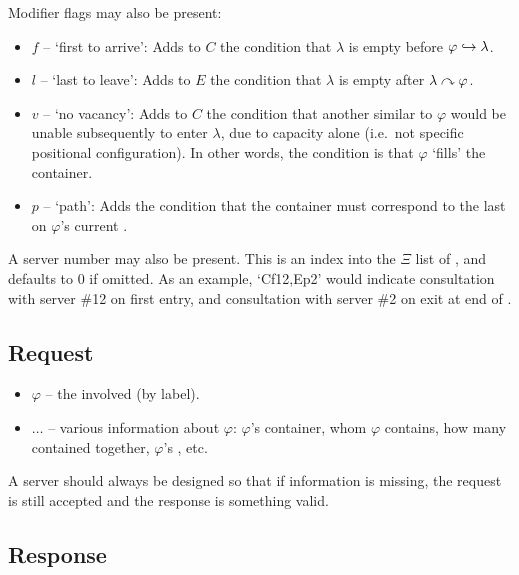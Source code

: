 Modifier flags may also be present:
\begin{itemize}
\item $f$ -- `first to arrive': Adds to $C$ the condition that $\lambda$ is empty before ${\varphi} \hookrightarrow {\lambda}$.
\item $l$ -- `last to leave': Adds to $E$ the condition that $\lambda$ is empty after ${\lambda} \curvearrowright {\varphi}$.
\item $v$ -- `no vacancy': Adds to $C$ the condition that another  similar
  to $\varphi$ would be unable subsequently to enter $\lambda$, due to capacity alone (i.e.~not specific positional configuration).
  In other words, the condition is that $\varphi$ `fills' the container.
\item $p$ -- `path': Adds the condition that the container must correspond to the last  on $\varphi$'s current .
\end{itemize}

A server number may also be present. This is an index into the $\Xi$
list of , and defaults to $0$ if omitted. As an example,
`Cf12,Ep2' would indicate consultation with server \#12 on first
entry, and consultation with server \#2 on exit at end of .

\subsection{Request}
\begin{itemize}
\item $\varphi$ -- the  involved (by label).
\item $\dots$ -- various information about $\varphi$: $\varphi$'s container,
  whom $\varphi$ contains, how many contained together, $\varphi$'s , etc.
\end{itemize}  

A server should always be designed so that if information is missing,
the request is still accepted and the response is something valid.

\subsection{Response}


